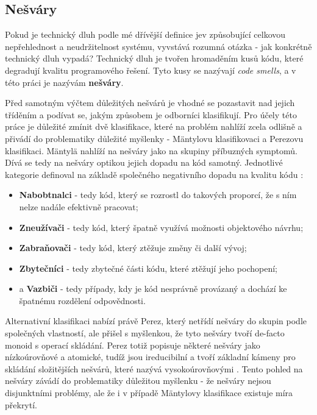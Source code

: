 \documentclass[FM,DP,fonts]{tulthesis}
\begin{document}
\subsection{Nešváry}
Pokud je technický dluh podle mé dřívější definice jev způsobující celkovou nepřehlednost a neudržitelnost systému, vyvstává rozumná otázka - jak konkrétně technický dluh vypadá? Technický dluh je tvořen hromaděním kusů kódu, které degradují kvalitu programového řešení. Tyto kusy se nazývají \textit{code smells}, a v této práci je nazývám \textbf{nešváry}.

Před samotným výčtem důležitých nešvárů je vhodné se pozastavit nad jejich tříděním a podívat se, jakým způsobem je odborníci klasifikují. Pro účely této práce je důležité zmínit dvě klasifikace, které na problém nahlíží zcela odlišně a přivádí do problematiky důležité myšlenky - Mäntylovu klasifikovaci a Perezovu klasifikaci. Mäntylä nahlíží na nešváry jako na skupiny příbuzných symptomů. Dívá se tedy na nešváry optikou jejich dopadu na kód samotný. Jednotlivé kategorie definoval na základě společného negativního dopadu na kvalitu kódu \parencites{mantyla-code-smells, refactoring-guru-smells}:

\begin{itemize}
	\item \textbf{Nabobtnalci} - tedy kód, který se rozrostl do takových proporcí, že s ním nelze nadále efektivně pracovat;
	\item \textbf{Zneužívači} - tedy kód, který špatně využívá možnosti objektového návrhu;
	\item \textbf{Zabraňovači} - tedy kód, který ztěžuje změny či další vývoj;
	\item \textbf{Zbytečníci} - tedy zbytečné části kódu, které ztěžují jeho pochopení;
	\item a \textbf{Vazbiči} - tedy případy, kdy je kód nesprávně provázaný a dochází ke špatnému rozdělení odpovědnosti.
\end{itemize}

Alternativní klasifikaci nabízí právě Perez, který netřídí nešváry do skupin podle společných vlastností, ale přišel s myšlenkou, že tyto nešváry tvoří de-facto monoid s operací skládání. Perez totiž popisuje některé nešváry jako nízkoúrovňové a atomické, tudíž jsou ireducibilní a tvoří základní kámeny pro skládání složitějších nešvárů, které nazývá vysokoúrovňovými \parencite{perez-code-smells}. Tento pohled na nešváry závádí do problematiky důležitou myšlenku - že nešváry nejsou disjunktními problémy, ale že i v případě Mäntylovy klasifikace existuje míra překrytí.
\end{document}
